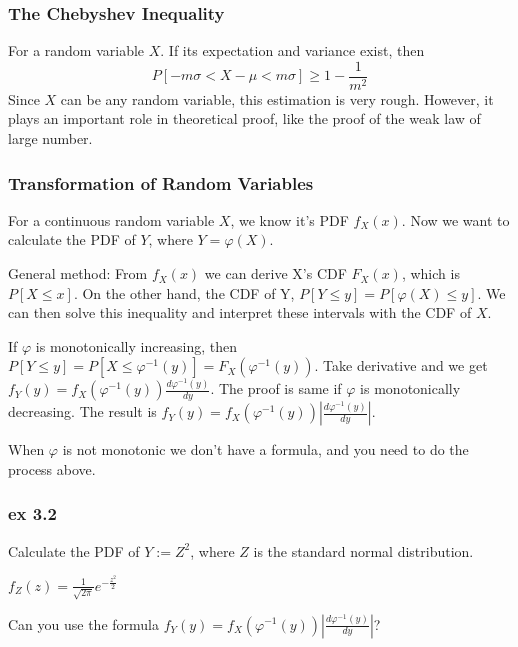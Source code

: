 \documentclass{beamer}
\begin{document}
\begin{frame}
    \frametitle{The Chebyshev Inequality}
    For a random variable $X$. If its expectation and variance exist, then
    \[P[-m\sigma <X-\mu < m\sigma]\geq 1-\frac{1}{m^2}\]
    Since $X$ can be any random variable, this estimation is very rough. However, it plays an important role in theoretical proof, like the proof of the weak law of large number.
    

\end{frame}

\begin{frame}
    \frametitle{Transformation of Random Variables}
    For a continuous random variable $X$, we know it's PDF $f_X(x)$. Now we want to calculate the PDF of $Y$, where $Y=\varphi(X)$.\par
    General method: From $f_X(x)$ we can derive X's CDF $F_X(x)$, which is $P[X\leq x]$. On the other hand, the CDF of Y, $P[Y\leq y]=P[\varphi(X)\leq y]$. We can then solve this inequality and interpret these intervals with the CDF of $X$.\par
    If $\varphi$ is monotonically increasing, then $P[Y\leq y]=P[X\leq \varphi^{-1}(y)]=F_X(\varphi^{-1}(y))$. Take derivative and we get $f_Y(y)=f_X(\varphi^{-1}(y))\frac{d\varphi^{-1}(y)}{dy}$. The proof is same if $\varphi$ is monotonically decreasing. The result is $f_Y(y)=f_X(\varphi^{-1}(y))|\frac{d\varphi^{-1}(y)}{dy}|$.\par
    When $\varphi$ is not monotonic we don't have a formula, and you need to do the process above.
    
\end{frame}

\begin{frame}
    \frametitle{ex 3.2}
    Calculate the PDF of $Y:=Z^2$, where $Z$ is the standard normal distribution.\par
    $f_Z(z)=\frac{1}{\sqrt{2\pi}}e^{-\frac{z^2}{2}}$\par
    Can you use the formula $f_Y(y)=f_X(\varphi^{-1}(y))|\frac{d\varphi^{-1}(y)}{dy}|$?

\end{frame}
\end{document}
